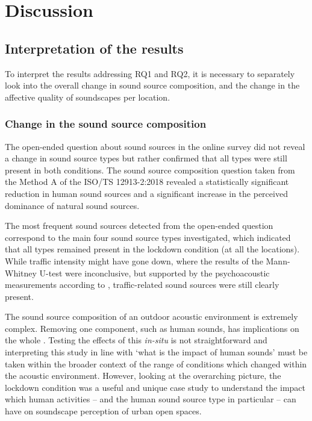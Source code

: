 
\section{Discussion}

 \subsection{Interpretation of the results}

   To interpret the results addressing RQ1 and RQ2, it is necessary to separately look into the overall change in sound source composition, and the change in the affective quality of soundscapes per location.

   \subsubsection{Change in the sound source composition}

   The open-ended question about sound sources in the online survey did not reveal a change in sound source types but rather confirmed that all types were still present in both conditions. The sound source composition question taken from the Method A of the ISO/TS 12913-2:2018 \citep{ISO12913Part2} revealed a statistically significant reduction in human sound sources and a significant increase in the perceived dominance of natural sound sources.

   The most frequent sound sources detected from the open-ended question correspond to the main four sound source types investigated, which indicated that all types remained present in the lockdown condition (at all the locations). While traffic intensity might have gone down, where the results of the Mann-Whitney U-test were inconclusive, but supported by the psychoacoustic measurements according to \citet{Aletta2020Assessing}, traffic-related sound sources were still clearly present.

   The sound source composition of an outdoor acoustic environment is extremely complex. Removing one component, such as human sounds, has implications on the whole \citep{Gordo2021Rapid}. Testing the effects of this \emph{in-situ} is not straightforward and interpreting this study in line with `what is the impact of human sounds' must be taken within the broader context of the range of conditions which changed within the acoustic environment. However, looking at the overarching picture, the lockdown condition was a useful and unique case study to understand the impact which human activities -- and the human sound source type in particular -- can have on soundscape perception of urban open spaces.

